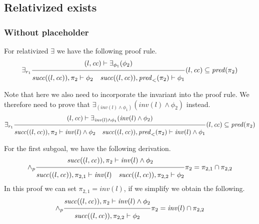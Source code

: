\documentclass{article}
\newcommand{\proofrule}[3][]{#1 \frac{\raisebox{.7ex}{\normalsize{$#2$}}}
  {\raisebox{-1.0ex}{\normalsize{$#3$}}}}
\newcommand{\placeholder}[1][]{\pi_{#1}}
\newcommand{\loc}{l}
\newcommand{\region}{\mathit{cc}}
\newcommand{\suc}{\mathit{succ}}
\newcommand{\pre}{\mathit{pred}}
\newcommand{\inv}{\mathit{inv}}
\begin{document}

\subsection{Relativized exists}
\subsubsection{Without placeholder}
For relativized $\exists$ we have the following proof rule.
\[
\proofrule[\exists_{r_1}]
{(\loc, \region) \vdash \exists_{\phi_1}(\phi_2)}
{\suc((\loc,\region)), \placeholder[2] \vdash \phi_2
\quad
\suc((\loc, \region)), \pre_{<}(\placeholder[2]) \vdash \phi_1
}
(\loc, \region) \subseteq \pre(\placeholder[2])
\]

Note that here we also need to incorporate the invariant into the proof rule. We therefore
need to prove that $\exists_{(\inv(\loc) \land \phi_1)}(\inv(\loc) \land \phi_2)$ instead.
\[
\proofrule[\exists_{r_1}]
{(\loc, \region) \vdash \exists_{\inv(\loc) \land \phi_1}(\inv(\loc) \land \phi_2)}
{\suc((\loc,\region)), \placeholder[2] \vdash \inv(\loc) \land \phi_2
\quad
\suc((\loc, \region)), \pre_{<}(\placeholder[2]) \vdash \inv(\loc) \land \phi_1
}
(\loc, \region) \subseteq \pre(\placeholder[2])
\]

For the first subgoal, we have the following derivation.
\[
\proofrule[\land_p]
{\suc((\loc,\region)), \placeholder[2] \vdash \inv(\loc) \land \phi_2}
{\suc((\loc,\region)), \placeholder[2,1] \vdash \inv(\loc)
\quad \suc((\loc,\region)), \placeholder[2,2] \vdash \phi_2}
\placeholder[2] = \placeholder[2,1] \cap \placeholder[2,2]
\]
In this proof we can set $\placeholder[2,1] = \inv(\loc)$, if we simplify we obtain the following.
\[
\proofrule[\land_p]
{\suc((\loc,\region)), \placeholder[2] \vdash \inv(\loc) \land \phi_2}
{\suc((\loc,\region)), \placeholder[2,2] \vdash \phi_2}
\placeholder[2] = \inv(\loc) \cap \placeholder[2,2]
\]
\end{document}
